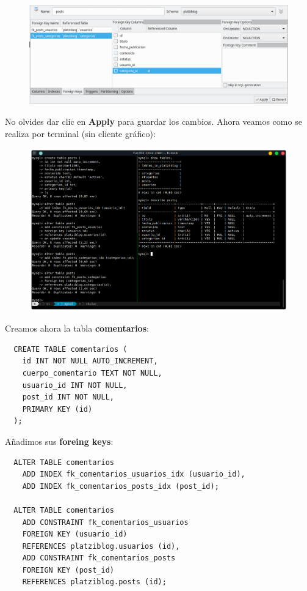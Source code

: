 \documentclass{article}
\begin{document}
\begin{figure}[h!]
  \centering
  \includegraphics[scale=0.55]{./Pictures/070_fk.png}
\end{figure}

No olvides dar clic en \textbf{Apply} para guardar los cambios. Ahora veamos
como se realiza por terminal (sin cliente gráfico):\\

\begin{figure}[h!]
  \centering
  \includegraphics[scale=0.60]{./Pictures/153_platziblog_t_dependientes.png}
\end{figure}

\newpage

Creamos ahora la tabla \textbf{comentarios}:

\begin{verbatim}
  CREATE TABLE comentarios (
    id INT NOT NULL AUTO_INCREMENT,
    cuerpo_comentario TEXT NOT NULL,
    usuario_id INT NOT NULL,
    post_id INT NOT NULL,
    PRIMARY KEY (id)
  );
\end{verbatim}

Añadimos sus \textbf{foreing keys}:

\begin{verbatim}
  ALTER TABLE comentarios
    ADD INDEX fk_comentarios_usuarios_idx (usuario_id),
    ADD INDEX fk_comentarios_posts_idx (post_id);

  ALTER TABLE comentarios
    ADD CONSTRAINT fk_comentarios_usuarios
    FOREIGN KEY (usuario_id)
    REFERENCES platziblog.usuarios (id),
    ADD CONSTRAINT fk_comentarios_posts
    FOREIGN KEY (post_id)
    REFERENCES platziblog.posts (id);
\end{verbatim}
\end{document}
